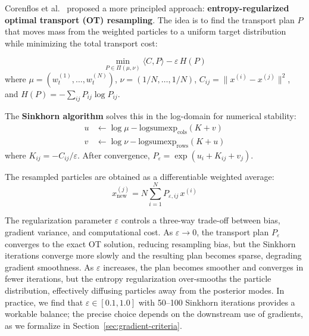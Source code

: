 \documentclass[12pt,a4paper]{article}
\theoremstyle{definition}
\theoremstyle{remark}
\begin{document}
Corenflos et al.\ \citep{corenflos2021} proposed a more principled approach: \textbf{entropy-regularized optimal transport (OT) resampling}. The idea is to find the transport plan $P$ that moves mass from the weighted particles to a uniform target distribution while minimizing the total transport cost:

\begin{tcolorbox}[colback=blue!5!white,colframe=blue!75!black,title=Entropy-Regularized OT Resampling]
	\begin{equation}
		\min_{P \in \Pi(\mu, \nu)} \langle C, P \rangle - \varepsilon \, H(P)
	\end{equation}
	where $\mu = (w_t^{(1)}, \ldots, w_t^{(N)})$, $\nu = (1/N, \ldots, 1/N)$, $C_{ij} = \|x^{(i)} - x^{(j)}\|^2$, and $H(P) = -\sum_{ij} P_{ij} \log P_{ij}$.
\end{tcolorbox}

The \textbf{Sinkhorn algorithm} solves this in the log-domain for numerical stability:
\begin{align}
	u &\leftarrow \log \mu - \text{logsumexp}_\text{cols}(K + v) \\
	v &\leftarrow \log \nu - \text{logsumexp}_\text{rows}(K + u)
\end{align}
where $K_{ij} = -C_{ij} / \varepsilon$. After convergence, $P_\varepsilon = \exp(u_i + K_{ij} + v_j)$.

The resampled particles are obtained as a differentiable weighted average:
\begin{equation}
	x_\text{new}^{(j)} = N \sum_{i=1}^{N} P_{\varepsilon,ij} \, x^{(i)}
\end{equation}

The regularization parameter $\varepsilon$ controls a three-way trade-off between bias, gradient variance, and computational cost. As $\varepsilon \to 0$, the transport plan $P_\varepsilon$ converges to the exact OT solution, reducing resampling bias, but the Sinkhorn iterations converge more slowly and the resulting plan becomes sparse, degrading gradient smoothness. As $\varepsilon$ increases, the plan becomes smoother and converges in fewer iterations, but the entropy regularization over-smooths the particle distribution, effectively diffusing particles away from the posterior modes. In practice, we find that $\varepsilon \in [0.1, 1.0]$ with 50--100 Sinkhorn iterations provides a workable balance; the precise choice depends on the downstream use of gradients, as we formalize in Section~\ref{sec:gradient-criteria}.


\end{document}
